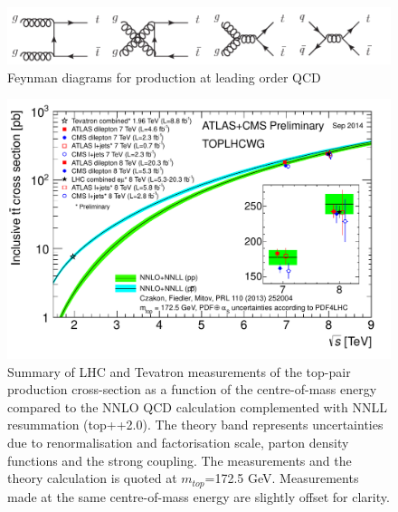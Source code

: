\begin{figure}
\includegraphics[width=\textwidth]{fig/fig_ttbar.png}
\caption{Feynman diagrams for \ttbar production at leading order QCD}
\label{fig:ttdiag}
\end{figure}

\begin{figure}
\includegraphics[width=\textwidth]{fig/tt_xsec_vsroots.pdf}
\caption{Summary of LHC and Tevatron measurements of the top-pair production cross-section as a function of the centre-of-mass energy compared to the NNLO QCD calculation complemented with NNLL resummation (top++2.0). The theory band represents uncertainties due to renormalisation and factorisation scale, parton density functions and the strong coupling. The measurements and the theory calculation is quoted at $m_{top}$=172.5 GeV. Measurements made at the same centre-of-mass energy are slightly offset for clarity.}
\label{fig:ttxsec}
\end{figure}


